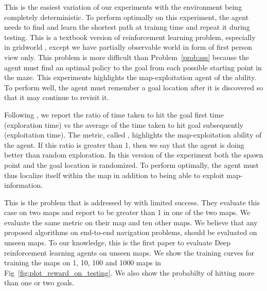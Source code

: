 \begin{description}
  \label{prob:sss}
   This is the easiest variation of our experiments with the environment
   being completely deterministic. 
   To perform optimally on this experiment, the agent needs to find and learn the
   shortest path at trainng time and repeat it during testing. 
  This is a textbook version of reinforcement learning problem, especially in gridworld \cite{SuBaBOOK1998}, except we have partially observable world in form of first person view only.
  This problem is more difficult than Problem~\ref{prob:sss} because the agent
  must find an optimal policy to the goal from each possible starting point in the maze.
  This experiments highlights the map-exploitation agent of the ability. To perform well, the agent must remember a goal location after it is discovered so that it may continue to revisit it.  
  
  Following \cite{MiPaViICLR2017}, we report the ratio
  of time taken to hit the goal first time (exploration time) vs the average of the time taken to hit goal subsequently (exploitation time). The metric, called \LatencyOneGtOne{}, highlights the map-exploitation ability of the agent. 
  If this ratio is greater than 1, then we say that the agent is doing better than random exploration.
  In this version of the experiment both the spawn point and the goal location is randomized. To perform optimally, the agent must thus localize itself within the map in addition to being able to exploit map-information.

  This is the problem that is addressed by \cite{MiPaViICLR2017} with limited success. 
  They evaluate this case on two maps and report \LatencyOneGtOne{} to be greater than 1 in one of the two maps. We evaluate the same metric on their map and ten other maps.
    We believe that any proposed algorithms on end-to-end navigation problems, should be evaluated on unseen maps.
    To our knowledge, this is the first paper to evaluate Deep reinforcement learning agents on unseen maps.
    We show the training curves for training the maps on 1, 10, 100 and 1000 maps in Fig~\ref{fig:plot_reward_on_testing}. We also show the probabilty of hitting more than one or two goals. 
\end{description}

